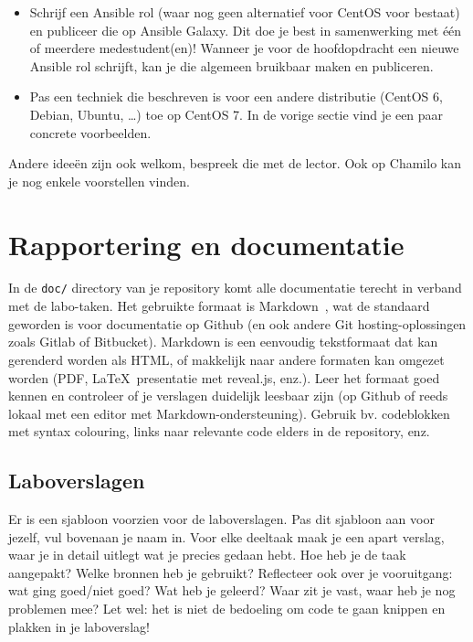 \begin{itemize}
\item Schrijf een Ansible rol (waar nog geen alternatief voor CentOS voor bestaat) en publiceer die op Ansible Galaxy. Dit doe je best in samenwerking met één of meerdere medestudent(en)! Wanneer je voor de hoofdopdracht een nieuwe Ansible rol schrijft, kan je die algemeen bruikbaar maken en publiceren.
\item Pas een techniek die beschreven is voor een andere distributie (CentOS 6, Debian, Ubuntu, \ldots{}) toe op CentOS 7. In de vorige sectie vind je een paar concrete voorbeelden.
\end{itemize}

Andere ideeën zijn ook welkom, bespreek die met de lector. Ook op Chamilo kan je nog enkele voorstellen vinden.

\section{Rapportering en documentatie}
\label{sec:rapportering-en-documentatie}

In de \texttt{doc/} directory van je repository komt alle documentatie terecht in verband met de labo-taken. Het gebruikte formaat is Markdown~\autocite{Gruber2004,Github2016}, wat de standaard geworden is voor documentatie op Github (en ook andere Git hosting-oplossingen zoals Gitlab of Bitbucket). Markdown is een eenvoudig tekstformaat dat kan gerenderd worden als HTML, of makkelijk naar andere formaten kan omgezet worden (PDF, \LaTeX\, presentatie met reveal.js, enz.). Leer het formaat goed kennen en controleer of je verslagen duidelijk leesbaar zijn (op Github of reeds lokaal met een editor met Markdown-ondersteuning). Gebruik bv. codeblokken met syntax colouring, links naar relevante code elders in de repository, enz.

\subsection{Laboverslagen}
\label{subs:laboverslagen}

Er is een sjabloon voorzien voor de laboverslagen. Pas dit sjabloon aan voor jezelf, vul bovenaan je naam in. Voor elke deeltaak maak je een apart verslag, waar je in detail uitlegt wat je precies gedaan hebt. Hoe heb je de taak aangepakt? Welke bronnen heb je gebruikt? Reflecteer ook over je vooruitgang: wat ging goed/niet goed? Wat heb je geleerd? Waar zit je vast, waar heb je nog problemen mee? Let wel: het is niet de bedoeling om code te gaan knippen en plakken in je laboverslag!

